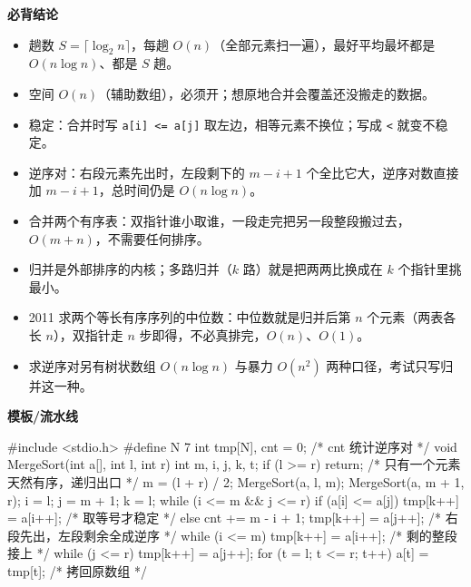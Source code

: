 \documentclass[10pt,a4paper]{ctexart}
\begin{document}




\textbf{必背结论}

\begin{itemize}

\item 趟数 $S=\lceil\log_2 n\rceil$，每趟 $O(n)$（全部元素扫一遍），最好平均最坏都是 $O(n\log n)$、都是 $S$ 趟。

\item 空间 $O(n)$（辅助数组），必须开；想原地合并会覆盖还没搬走的数据。

\item 稳定：合并时写 \texttt{a[i] <= a[j]} 取左边，相等元素不换位；写成 \texttt{<} 就变不稳定。

\item 逆序对：右段元素先出时，左段剩下的 $m-i+1$ 个全比它大，逆序对数直接加 $m-i+1$，总时间仍是 $O(n\log n)$。

\item 合并两个有序表：双指针谁小取谁，一段走完把另一段整段搬过去，$O(m+n)$，不需要任何排序。

\item 归并是外部排序的内核；多路归并（$k$ 路）就是把两两比换成在 $k$ 个指针里挑最小。

\item 2011 求两个等长有序序列的中位数：中位数就是归并后第 $n$ 个元素（两表各长 $n$），双指针走 $n$ 步即得，不必真排完，$O(n)$、$O(1)$。

\item 求逆序对另有树状数组 $O(n\log n)$ 与暴力 $O(n^2)$ 两种口径，考试只写归并这一种。

\end{itemize}

\textbf{模板/流水线}

\begin{codebox}
#include <stdio.h>
#define N 7
int tmp[N], cnt = 0;                    /* cnt 统计逆序对 */
void MergeSort(int a[], int l, int r) {
    int m, i, j, k, t;
    if (l >= r) return;                 /* 只有一个元素天然有序，递归出口 */
    m = (l + r) / 2;
    MergeSort(a, l, m);
    MergeSort(a, m + 1, r);
    i = l; j = m + 1; k = l;
    while (i <= m && j <= r) {
        if (a[i] <= a[j]) tmp[k++] = a[i++];             /* 取等号才稳定 */
        else { cnt += m - i + 1; tmp[k++] = a[j++]; }    /* 右段先出，左段剩余全成逆序 */
    }
    while (i <= m) tmp[k++] = a[i++];                    /* 剩的整段接上 */
    while (j <= r) tmp[k++] = a[j++];
    for (t = l; t <= r; t++) a[t] = tmp[t];              /* 拷回原数组 */
}
\end{codebox}
\end{document}
